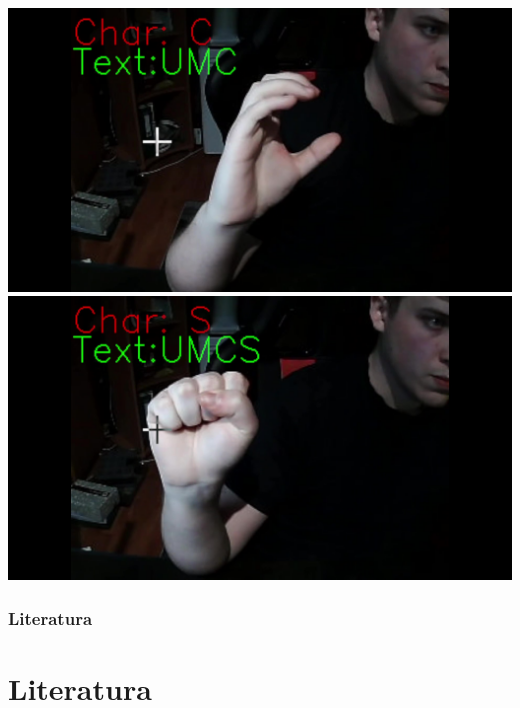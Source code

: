 \documentclass{beamer}
\begin{document}
\begin{frame}
\begin{center}
			\includegraphics[scale=0.07]{C}
			\includegraphics[scale=0.07]{S}
		\end{center}
	\end{frame}

	\begin{frame}
		\frametitle{Literatura}
		\section{Literatura}
		\printbibliography
	\end{frame}
\end{document}
